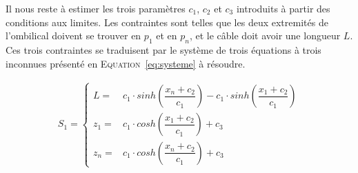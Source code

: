     Il nous reste à estimer les trois paramètres $c_1$, $c_2$ et $c_3$ introduits à partir des conditions aux limites. Les contraintes sont telles que les deux extremités de l'ombilical doivent se trouver en $p_1$ et en $p_n$, et le câble doit avoir une longueur $L$. Ces trois contraintes se traduisent par le système de trois équations à trois inconnues présenté en \textsc{Equation}~\ref{eq:systeme} à résoudre.
    
    \begin{align}
        S_1 = 
        \begin{cases}
            L   = & c_1 \cdot sinh\left(\dfrac{x_n+c_2}{c_1}\right) - c_1 \cdot sinh\left(\dfrac{x_1+c_2}{c_1}\right) \\
            z_1 = & c_1 \cdot cosh\left(\dfrac{x_1+c_2}{c_1}\right)+c_3 \\
            z_n = & c_1 \cdot cosh\left(\dfrac{x_n+c_2}{c_1}\right)+c_3
        \end{cases}
        \label{eq:systeme}
    \end{align}

